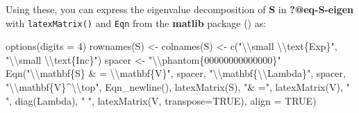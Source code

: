 \documentclass[
  letterpaper,
  10pt,
  krantz2]{krantz}
\makeatletter
\newenvironment{Shaded}{\begin{snugshade}}{\end{snugshade}}
\newcommand{\AttributeTok}[1]{\textcolor[rgb]{0.40,0.45,0.13}{#1}}
\newcommand{\ConstantTok}[1]{\textcolor[rgb]{0.56,0.35,0.01}{#1}}
\newcommand{\DecValTok}[1]{\textcolor[rgb]{0.68,0.00,0.00}{#1}}
\newcommand{\FunctionTok}[1]{\textcolor[rgb]{0.28,0.35,0.67}{#1}}
\newcommand{\NormalTok}[1]{\textcolor[rgb]{0.00,0.23,0.31}{#1}}
\newcommand{\OtherTok}[1]{\textcolor[rgb]{0.00,0.23,0.31}{#1}}
\newcommand{\SpecialCharTok}[1]{\textcolor[rgb]{0.37,0.37,0.37}{#1}}
\newcommand{\StringTok}[1]{\textcolor[rgb]{0.13,0.47,0.30}{#1}}
\newenvironment{kframe}{%
  \medskip{}
  \setlength{\fboxsep}{.8em}
  \def\at@end@of@kframe{}%
  \ifinner\ifhmode%
  \def\at@end@of@kframe{\end{minipage}}%
  \begin{minipage}{\columnwidth}%
  \fi\fi%
  \def\FrameCommand##1{\hskip\@totalleftmargin \hskip-\fboxsep
  \colorbox{shadecolor}{##1}\hskip-\fboxsep
      \hskip-\linewidth \hskip-\@totalleftmargin \hskip\columnwidth}%
  \MakeFramed {\advance\hsize-\width
    \@totalleftmargin\z@ \linewidth\hsize
    \@setminipage}}%
{\par\unskip\endMakeFramed%
  \at@end@of@kframe}
\renewenvironment{Shaded}{\begin{kframe}}{\end{kframe}}
\makeatother
\begin{document}
Using these, you can express the eigenvalue decomposition of
\(\mathbf{S}\) in \textbf{?@eq-S-eigen} with \texttt{latexMatrix()} and
\texttt{Eqn} from the \textbf{matlib} package
() as:

\begin{Shaded}
\begin{Highlighting}[]
\FunctionTok{options}\NormalTok{(}\AttributeTok{digits =} \DecValTok{4}\NormalTok{)}
\FunctionTok{rownames}\NormalTok{(S) }\OtherTok{\textless{}{-}} \FunctionTok{colnames}\NormalTok{(S) }\OtherTok{\textless{}{-}} \FunctionTok{c}\NormalTok{(}\StringTok{"}\SpecialCharTok{\textbackslash{}\textbackslash{}}\StringTok{small }\SpecialCharTok{\textbackslash{}\textbackslash{}}\StringTok{text\{Exp\}"}\NormalTok{, }
                                \StringTok{"}\SpecialCharTok{\textbackslash{}\textbackslash{}}\StringTok{small }\SpecialCharTok{\textbackslash{}\textbackslash{}}\StringTok{text\{Inc\}"}\NormalTok{)}
\NormalTok{spacer }\OtherTok{\textless{}{-}} \StringTok{"}\SpecialCharTok{\textbackslash{}\textbackslash{}}\StringTok{phantom\{00000000000000\}"}
\FunctionTok{Eqn}\NormalTok{(}\StringTok{"}\SpecialCharTok{\textbackslash{}\textbackslash{}}\StringTok{mathbf\{S\} \& = }\SpecialCharTok{\textbackslash{}\textbackslash{}}\StringTok{mathbf\{V\}"}\NormalTok{, spacer,}
    \StringTok{"}\SpecialCharTok{\textbackslash{}\textbackslash{}}\StringTok{mathbf\{}\SpecialCharTok{\textbackslash{}\textbackslash{}}\StringTok{Lambda\}"}\NormalTok{, spacer,  }
    \StringTok{"}\SpecialCharTok{\textbackslash{}\textbackslash{}}\StringTok{mathbf\{V\}\^{}}\SpecialCharTok{\textbackslash{}\textbackslash{}}\StringTok{top"}\NormalTok{, }\FunctionTok{Eqn\_newline}\NormalTok{(),}
    \FunctionTok{latexMatrix}\NormalTok{(S), }\StringTok{"\& ="}\NormalTok{, }
    \FunctionTok{latexMatrix}\NormalTok{(V), }\StringTok{"  "}\NormalTok{, }\FunctionTok{diag}\NormalTok{(Lambda), }\StringTok{"  "}\NormalTok{, }\FunctionTok{latexMatrix}\NormalTok{(V, }\AttributeTok{transpose=}\ConstantTok{TRUE}\NormalTok{),}
    \AttributeTok{align =} \ConstantTok{TRUE}\NormalTok{)}
\end{Highlighting}
\end{Shaded}
\end{document}
